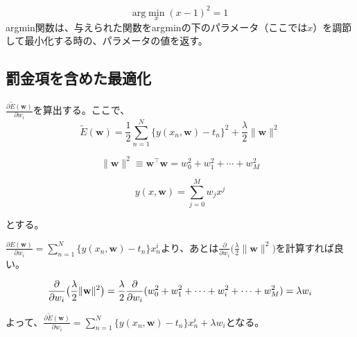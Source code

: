 \begin{equation*}
	\mathrm{arg}\!\min_{x} (x-1)^2 = 1
\end{equation*}
argmin関数は、与えられた関数をargminの下のパラメータ（ここでは$x$）を調節して最小化する時の、パラメータの値を返す。

\subsection*{罰金項を含めた最適化}
$\frac{\partial \tilde{E}(\mathbf{w}) }{\partial w_i}$を算出する。ここで、
\begin{equation*}
	\tilde{E}(\mathbf{w}) = \frac{1}{2} \sum_{n=1}^N \{  y(x_n, \mathbf{w}) - t_n \}^2 + \frac{\lambda}{2} \| \mathbf{w} \| ^ 2
\end{equation*}

\begin{equation*}
	\| \mathbf{w} \|^2 \equiv \mathbf{w}^{\top} \mathbf{w} = w_0^2 + w_1^2 + \cdots + w_M^2
\end{equation*}

\begin{equation*}
	y(x, \mathbf{w} ) = \sum_{j=0}^M w_j x^j
\end{equation*}

とする。


$\frac{\partial {E}(\mathbf{w}) }{\partial w_i} = \sum_{n=1}^N \{y(x_n, \mathbf{w}) - t_n \} x_n^i$より、あとは$\frac{\partial}{\partial w_i} \big( \frac{\lambda}{2} \| \mathbf{w} \| ^ 2 \big)$を計算すれば良い。

\begin{dmath*}
	\frac{\partial}{\partial w_i} \big( \frac{\lambda}{2} \| \mathbf{w} \| ^ 2 \big) \\
	= \frac{\lambda}{2} \frac{\partial}{\partial w_i} (w_0^2 + w_1^2 + \cdots + w_i^2 + \cdots +  w_M^2) \\
	= {\lambda}  w_i
\end{dmath*}

よって、$\frac{\partial \tilde{E}(\mathbf{w}) }{\partial w_i} = \sum_{n=1}^N \{y(x_n, \mathbf{w}) - t_n \} x_n^i + {\lambda}  w_i$となる。

